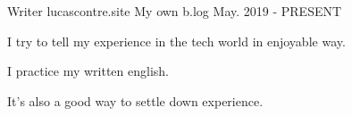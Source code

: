 

\begin{cventries}

  \cventry
  {Writer} %
  {lucascontre.site} %
  {My own b.log} %
  {May. 2019 - PRESENT} %
  {
  \begin{cvitems} %
    \item {I try to tell my experience in the tech world in enjoyable way.}
    \item {I practice my written english.}
    \item {It's also a good way to settle down experience.}
  \end{cvitems}
  }


\end{cventries}
